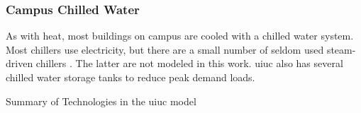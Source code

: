 \subsubsection{Campus Chilled Water}

As with heat, most buildings on campus are cooled with a chilled water system.
Most chillers use electricity, but there are a small number of seldom used
steam-driven chillers \cite{affiliated_engineers_inc_utilities_2015}. The latter
are not modeled in this work. \gls{uiuc} also has several chilled water storage
tanks to reduce peak demand loads.

\begin{table}[H]
  \centering
  \caption{Summary of Technologies in the \gls{uiuc} model}
  \label{tab:uiuc-tech}
  \resizebox{\textwidth}{!}{
  
  } %
\end{table}
